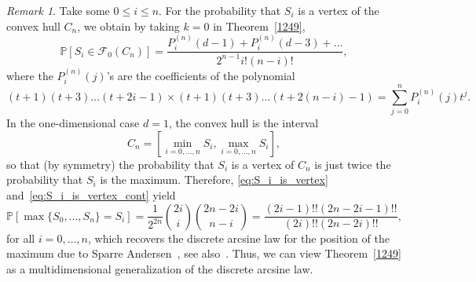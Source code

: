 \documentclass[12pt, reqno]{amsart}
\theoremstyle{plain}
\theoremstyle{definition}
\theoremstyle{remark}
\newtheorem{remark}[theorem]{Remark}
\begin{document}
\begin{remark}
Take some $0\leq i\leq n$. For the probability that $S_i$ is a vertex of the convex hull $C_n$, we obtain by taking $k=0$ in Theorem~\ref{1249},
\begin{equation}\label{eq:S_i_is_vertex}
{\mathbb{P}}[S_{i} \in \mathcal F_{0}(C_n)] =
\frac{P_{i}^{(n)}(d-1) + P_{i}^{(n)}(d-3)+\ldots}{2^{n-1} i!(n-i)!},
\end{equation}
where the $P_{i}^{(n)}(j)$'s  are the coefficients of the polynomial
\begin{equation}\label{eq:S_i_is_vertex_cont}
(t+1)(t+3)\ldots (t+2i-1)\times(t+1)(t+3)\ldots (t+2(n-i)-1) = \sum_{j=0}^n P_{i}^{(n)}(j) t^j.
\end{equation}
In the one-dimensional case $d=1$, the convex hull is the interval
$$
C_n = \left[\min_{i=0,\ldots,n}S_i, \max_{i=0,\ldots,n} S_i\right],
$$
so that (by symmetry) the probability that $S_i$ is a vertex of $C_n$ is just twice the probability that $S_i$ is the maximum. Therefore, \eqref{eq:S_i_is_vertex} and~\eqref{eq:S_i_is_vertex_cont} yield
\begin{equation}\label{eq:arcsine_maximum}
{\mathbb{P}}[\max\{S_0,\ldots,S_n\} = S_i] =
\frac 1 {2^{2n}} \binom{2i}{i} \binom{2n-2i}{n-i}
= \frac {(2i-1)!!(2n-2i-1)!!}{(2i)!!(2n-2i)!!},
\end{equation}
for all $i=0,\ldots,n$, which recovers the discrete arcsine law for the position of the maximum due to Sparre Andersen~\cite[Theorem~C]{sparre_andersen2}, see also~\cite[Vol II, Section XII.8]{Feller}.
Thus, we can view Theorem~\ref{1249} as a multidimensional generalization of the discrete arcsine law.
\end{remark}
\end{document}
